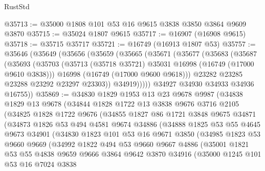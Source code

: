 \begin{lexlean}{RustStd}
\begin{coremodule}
@35713 := @35000 @1808 @101 @53 @16 @9615 @3838 @3850 @3864 @9609 @3870
@35715 := @35024 @1807 @9615
@35717 := @16907 (@16908 @9615)
@35718 := @35715 @35717
@35721 := @16749 (@16913 @1807 @53)
@35757 := @35646
    (@35649
      (@35656
        (@35659
          (@35665
            (@35671
              (@35677
                (@35683
                  (@35687
                    (@35693
                      (@35703
                        (@35713 (@35718 @35721) @35031 @16998 (@16749 (@17000 @9610 @3838)))
                        @16998
                        (@16749 (@17000 @9600 @9618)))
                      @23282
                      @23285
                      @23288
                      @23292
                      @23297
                      @23303))
                  @34919)))))
        @34927
        @34930
        @34933
        @34936
        @16755))
@35869 := @34830
    @1829
    @1953
    @13
    @23
    @9678
    @9987
    (@34838
      @1829
      @13
      @9678
      (@34844
        @1828
        @1722
        @13
        @3838
        @9676
        @3716
        @2105
        (@34825
          @1828
          @1722
          @9676
          (@34855
            @1827
            @86
            @1721
            @3848
            @9675
            @34871
            (@34873
              @1826
              @53
              @494
              @4581
              @9674
              @34886
              (@34888
                @1825
                @53
                @55
                @4645
                @9673
                @34901
                (@34830
                  @1823
                  @101
                  @53
                  @16
                  @9671
                  @3850
                  (@34985
                    @1823
                    @53
                    @9660
                    @9669
                    (@34992
                      @1822
                      @494
                      @53
                      @9660
                      @9667
                      @4886
                      (@35001
                        @1821
                        @53
                        @55
                        @4838
                        @9659
                        @9666
                        @3864
                        @9642
                        @3870
                        @34916
                        (@35000
                          @1245
                          @101
                          @53
                          @16
                          @7024
                          @3838

\end{coremodule}
\end{lexlean}
